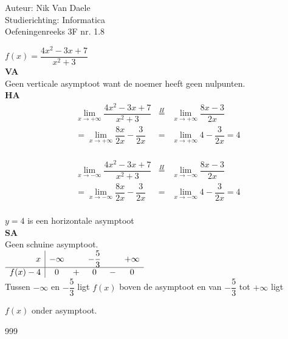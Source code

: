 \documentclass[a4paper]{article}
\newcommand{\llim}{\lim\limits}
\begin{document}
  
\noindent \large Auteur: Nik Van Daele \\
\noindent \large Studierichting: Informatica\\
\noindent \large Oefeningenreeks 3F nr. 1.8\\

\medskip

\normalsize

$f(x) = \dfrac{4x^2 - 3x + 7}{x^2 + 3}$\\

\textbf{VA}\\

Geen verticale asymptoot want de noemer heeft geen nulpunten.\\

\textbf{HA}\\

\begin{eqnarray*}
\llim_{x \rightarrow +\infty} \dfrac{4x^2 - 3x + 7}{x^2 + 3} &\overset{H}=& \llim_{x \rightarrow +\infty} \dfrac{8x -3}{2x}\\
= \llim_{x \rightarrow +\infty} \dfrac{8x}{2x} - \dfrac{3}{2x} &=& \llim_{x \rightarrow +\infty} 4 - \dfrac{3}{2x}=4\\
\end{eqnarray*}

\begin{eqnarray*}
\llim_{x \rightarrow -\infty} \dfrac{4x^2 - 3x + 7}{x^2 + 3} &\overset{H}=& \llim_{x \rightarrow -\infty} \dfrac{8x -3}{2x}\\
= \llim_{x \rightarrow -\infty} \dfrac{8x}{2x} - \dfrac{3}{2x} &=& \llim_{x \rightarrow -\infty} 4 - \dfrac{3}{2x}=4\\
\end{eqnarray*}

$y = 4$ is een horizontale asymptoot\\

\textbf{SA}\\

Geen schuine asymptoot.\\

$\begin{array}{r|c c c c c c}
x & -\infty & & -\dfrac{5}{3} & & +\infty \\ \hline
f(x)-4 & 0 & + & 0 & - & 0 \\
\end{array}$\\

Tussen $-\infty$ en $-\dfrac{5}{3}$ ligt $f(x)$ boven de asymptoot en van $-\dfrac{5}{3}$ tot $+\infty$ ligt

$f(x)$ onder asymptoot.\\

\begin{thebibliography}{999}
\end{thebibliography}
\end{document}
